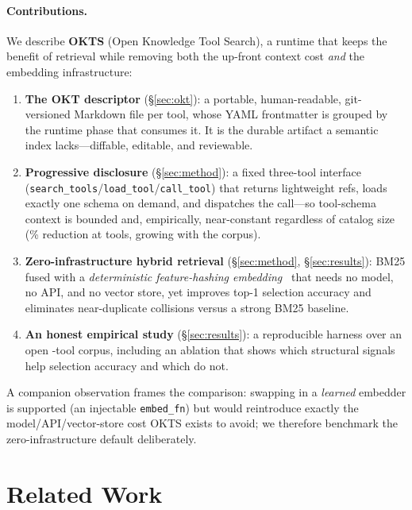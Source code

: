 \documentclass[11pt]{article}
\begin{document}
\paragraph{Contributions.} We describe \textbf{OKTS} (Open Knowledge Tool
Search), a runtime that keeps the benefit of retrieval while removing both the
up-front context cost \emph{and} the embedding infrastructure:

\begin{enumerate}
  \item \textbf{The OKT descriptor} (\S\ref{sec:okt}): a portable, human-readable,
    git-versioned Markdown file per tool, whose YAML frontmatter is grouped by the
    runtime phase that consumes it. It is the durable artifact a semantic index
    lacks---diffable, editable, and reviewable.
  \item \textbf{Progressive disclosure} (\S\ref{sec:method}): a fixed three-tool
    interface (\texttt{search\_tools}/\texttt{load\_tool}/\texttt{call\_tool})
    that returns lightweight refs, loads exactly one schema on demand, and
    dispatches the call---so tool-schema context is bounded and, empirically,
    near-constant regardless of catalog size (\reductionFull\% reduction at
    \numTools{} tools, growing with the corpus).
  \item \textbf{Zero-infrastructure hybrid retrieval} (\S\ref{sec:method},
    \S\ref{sec:results}): BM25 fused with a \emph{deterministic feature-hashing
    embedding}~\citep{weinberger2009hashing} that needs no model, no API, and no
    vector store, yet improves top-1 selection accuracy and eliminates
    near-duplicate collisions versus a strong BM25 baseline.
  \item \textbf{An honest empirical study} (\S\ref{sec:results}): a reproducible
    harness over an open \numTools-tool corpus, including an ablation that shows
    which structural signals help selection accuracy and which do not.
\end{enumerate}

A companion observation frames the comparison: swapping in a \emph{learned}
embedder is supported (an injectable \texttt{embed\_fn}) but would reintroduce
exactly the model/API/vector-store cost OKTS exists to avoid; we therefore
benchmark the zero-infrastructure default deliberately.

\section{Related Work}
\end{document}
